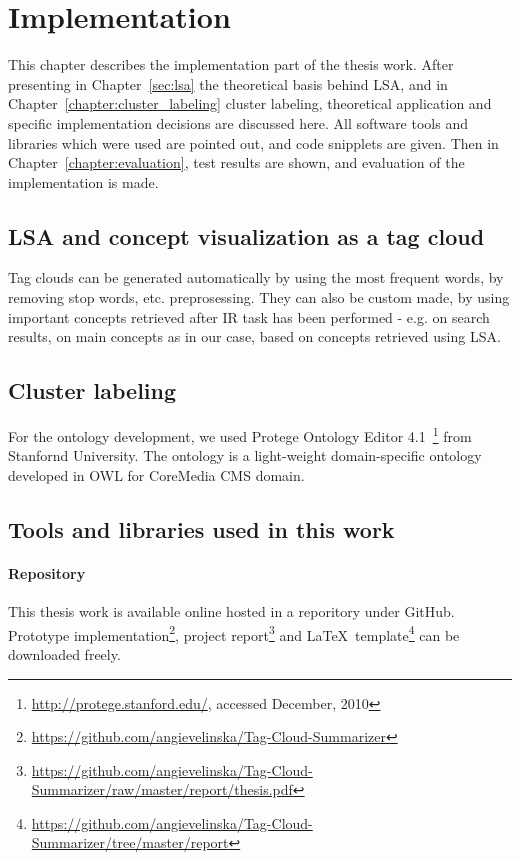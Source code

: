 \chapter{Implementation}
\label{sec:implementation}

This chapter describes the implementation part of the thesis work. After presenting in Chapter~\ref{sec:lsa} the theoretical basis behind \gls{LSA}, and in Chapter~\ref{chapter:cluster_labeling} cluster labeling, theoretical application and specific implementation decisions are discussed here. All software tools and libraries which were used are pointed out, and code snipplets are given. Then in Chapter~\ref{chapter:evaluation}, test results are shown, and evaluation of the implementation is made. \\


\section{LSA and concept visualization  as a tag cloud}
Tag clouds can be generated automatically by using the most frequent words, by removing stop words, etc. preprosessing. They can also be custom made, by using important concepts retrieved after \gls{IR} task has been performed - e.g. on search results, on main concepts as in our case, based on concepts retrieved using \gls{LSA}. \\


\section{Cluster labeling}
For the ontology development, we used Protege Ontology Editor 4.1~\footnote{\url{http://protege.stanford.edu/}, accessed December, 2010} from Stanfornd University. The ontology is a light-weight domain-specific ontology developed in OWL for CoreMedia \gls{CMS} domain. \\


\section{Tools and libraries used in this work}
\label{sec:implementation:tools_used}

\subsubsection{Repository}
This thesis work is available online hosted in a reporitory under GitHub. Prototype implementation\footnote{\url{https://github.com/angievelinska/Tag-Cloud-Summarizer}}, project report\footnote{\url{https://github.com/angievelinska/Tag-Cloud-Summarizer/raw/master/report/thesis.pdf}} and \LaTeX~template\footnote{\url{https://github.com/angievelinska/Tag-Cloud-Summarizer/tree/master/report}} can be downloaded freely. \\

